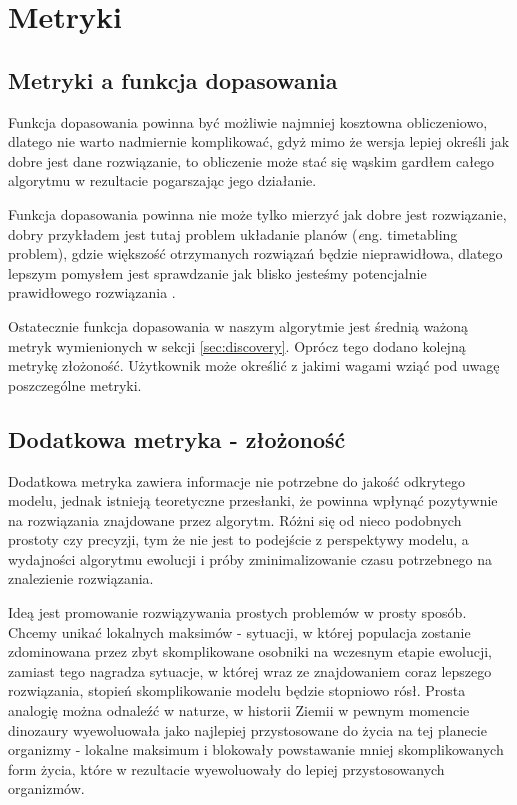 
\section{Metryki}
\label{sec:metryki}

\subsection{Metryki a funkcja dopasowania}

Funkcja dopasowania powinna być możliwie najmniej kosztowna obliczeniowo, dlatego nie warto nadmiernie komplikować, gdyż mimo że wersja lepiej określi jak dobre jest dane rozwiązanie, to obliczenie może stać się wąskim gardłem całego algorytmu w rezultacie pogarszając jego działanie.   

Funkcja dopasowania powinna nie może tylko mierzyć jak dobre jest rozwiązanie, dobry przykładem jest tutaj problem układanie planów (\textit eng. timetabling problem), gdzie większość otrzymanych rozwiązań będzie nieprawidłowa, dlatego lepszym pomysłem jest sprawdzanie jak blisko jesteśmy potencjalnie prawidłowego rozwiązania \cite{icga85:cramer} \cite{beasley:1993:ogapf}.

Ostatecznie funkcja dopasowania w naszym algorytmie jest średnią ważoną metryk wymienionych w sekcji \ref{sec:discovery}. Oprócz tego dodano kolejną metrykę złożoność. Użytkownik może określić z jakimi wagami wziąć pod uwagę poszczególne metryki.

\subsection{Dodatkowa metryka - złożoność}
Dodatkowa metryka zawiera informacje nie potrzebne do jakość odkrytego modelu, jednak istnieją teoretyczne przesłanki, że powinna wpłynąć pozytywnie na rozwiązania znajdowane przez algorytm. Różni się od nieco podobnych prostoty czy precyzji, tym że nie jest to podejście z perspektywy modelu, a wydajności algorytmu ewolucji i próby zminimalizowanie czasu potrzebnego na znalezienie rozwiązania.
 
Ideą jest promowanie rozwiązywania prostych problemów w prosty sposób. Chcemy unikać lokalnych maksimów - sytuacji, w której populacja zostanie zdominowana przez zbyt skomplikowane osobniki na wczesnym etapie ewolucji, zamiast tego nagradza sytuacje, w której wraz ze znajdowaniem coraz lepszego rozwiązania, stopień skomplikowanie modelu będzie stopniowo rósł.
Prosta analogię można odnaleźć w naturze, w historii Ziemii w pewnym momencie dinozaury wyewoluowała jako najlepiej przystosowane do życia na tej planecie organizmy - lokalne maksimum i blokowały powstawanie mniej skomplikowanych form życia, które w rezultacie wyewoluowały do lepiej przystosowanych organizmów.

